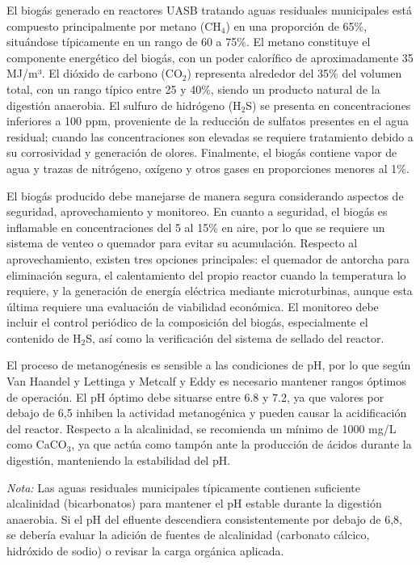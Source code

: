 El biogás generado en reactores UASB tratando aguas residuales municipales está compuesto principalmente por metano (CH$_4$) en una proporción de 65\%, situándose típicamente en un rango de 60 a 75\%. El metano constituye el componente energético del biogás, con un poder calorífico de aproximadamente 35 MJ/m³. El dióxido de carbono (CO$_2$) representa alrededor del 35\% del volumen total, con un rango típico entre 25 y 40\%, siendo un producto natural de la digestión anaerobia. El sulfuro de hidrógeno (H$_2$S) se presenta en concentraciones inferiores a 100 ppm, proveniente de la reducción de sulfatos presentes en el agua residual; cuando las concentraciones son elevadas se requiere tratamiento debido a su corrosividad y generación de olores. Finalmente, el biogás contiene vapor de agua y trazas de nitrógeno, oxígeno y otros gases en proporciones menores al 1\%.

El biogás producido debe manejarse de manera segura considerando aspectos de seguridad, aprovechamiento y monitoreo. En cuanto a seguridad, el biogás es inflamable en concentraciones del 5 al 15\% en aire, por lo que se requiere un sistema de venteo o quemador para evitar su acumulación. Respecto al aprovechamiento, existen tres opciones principales: el quemador de antorcha para eliminación segura, el calentamiento del propio reactor cuando la temperatura lo requiere, y la generación de energía eléctrica mediante microturbinas, aunque esta última requiere una evaluación de viabilidad económica. El monitoreo debe incluir el control periódico de la composición del biogás, especialmente el contenido de H$_2$S, así como la verificación del sistema de sellado del reactor.

El proceso de metanogénesis es sensible a las condiciones de pH, por lo que según Van Haandel y Lettinga \cite{vanhaandel1994} y Metcalf y Eddy \cite{metcalf2014} es necesario mantener rangos óptimos de operación. El pH óptimo debe situarse entre 6.8 y 7.2, ya que valores por debajo de 6,5 inhiben la actividad metanogénica y pueden causar la acidificación del reactor. Respecto a la alcalinidad, se recomienda un mínimo de 1000 mg/L como CaCO$_3$, ya que actúa como tampón ante la producción de ácidos durante la digestión, manteniendo la estabilidad del pH.

\textit{Nota:} Las aguas residuales municipales típicamente contienen suficiente alcalinidad (bicarbonatos) para mantener el pH estable durante la digestión anaerobia. Si el pH del efluente descendiera consistentemente por debajo de 6,8, se debería evaluar la adición de fuentes de alcalinidad (carbonato cálcico, hidróxido de sodio) o revisar la carga orgánica aplicada.

